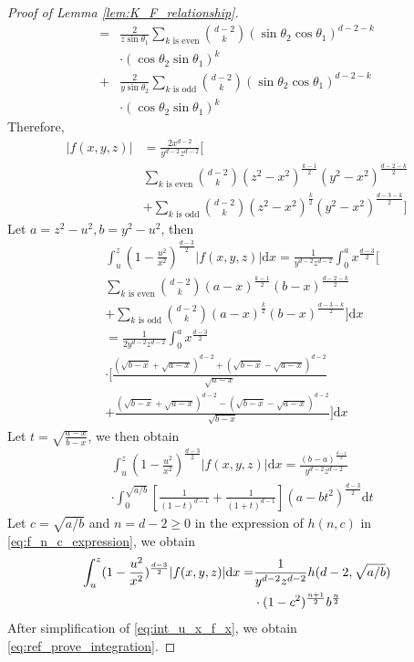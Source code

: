 \documentclass[conference,a4paper]{IEEEtran}
\def\dd{\mathrm{d}}
\begin{document}
\begin{proof}[Proof of Lemma \ref{lem:K_F_relationship}]
\begin{align*}
=&\frac{2}{z\sin\theta_1}\sum_{k \textrm{ is even}}
\binom{d-2}{k} (\sin\theta_2\cos\theta_1)^{d-2-k}\\
&\cdot(\cos\theta_2 \sin\theta_1)^k \\
+&\frac{2}{y\sin\theta_2} \sum_{k \textrm{ is odd}}
\binom{d-2}{k} (\sin\theta_2\cos\theta_1)^{d-2-k}\\
&\cdot(\cos\theta_2 \sin\theta_1)^k
\end{align*}
Therefore,
\begin{align*}
|f(x,y,z)|
&= \frac{2x^{d-2}}{y^{d-2}z^{d-2}}
\Big[
     \\
    &\sum_{k \textrm{ is even}}
    \binom{d-2}{k} (z^2-x^2)^{\frac{k-1}{2}}(y^2-x^2)^{\frac{d-2-k}{2}}\\
    &+ \sum_{k \textrm{ is odd}}
    \binom{d-2}{k}    (z^2-x^2)^{\frac{k}{2}}
    (y^2-x^2)^{\frac{d-3-k}{2}}
\Big]
\end{align*}
Let $a=z^2-u^2, b=y^2-u^2$, then
\begin{align*}
     &\int_u^z (1-\frac{u^2}{x^2})^{\frac{d-3}{2}}
     |f(x,y,z)|\dd x
     =\frac{1}{y^{d-2}z^{d-2}}
     \int_0^a x^{\frac{d-3}{2}}\Big[ \\
     &\sum_{k \textrm{ is even}}
     \binom{d-2}{k} (a-x)^{\frac{k-1}{2}}
     (b-x)^{\frac{d-2-k}{2}}\\
     &+ \sum_{k \textrm{ is odd}}
     \binom{d-2}{k} (a-x)^{\frac{k}{2}}
     (b-x)^{\frac{d-3-k}{2}}
     \Big]\dd x\\
     &=\frac{1}{2y^{d-2}z^{d-2}}
     \int_0^a x^{\frac{d-3}{2}}\\
     &\cdot\Big[\frac{(\sqrt{b-x} + \sqrt{a-x})^{d-2}+(\sqrt{b-x} - \sqrt{a-x})^{d-2}}{\sqrt{a-x}}\\
     &+\frac{(\sqrt{b-x} + \sqrt{a-x})^{d-2}-(\sqrt{b-x} - \sqrt{a-x})^{d-2}}{\sqrt{b-x}}\Big] \dd x
\end{align*}
Let $t=\sqrt{\frac{a-x}{b-x}}$, we then obtain
\begin{align*}
     &\int_u^z (1-\frac{u^2}{x^2})^{\frac{d-3}{2}}
     |f(x,y,z)|\dd x= \frac{(b-a)^{\frac{d-1}{2}}}{y^{d-2}z^{d-2}}\\
     &\cdot\int_0^{\sqrt{a/b}}
     \left[\frac{1}{(1-t)^{d-1}}+\frac{1}{(1+t)^{d-1}}\right](a-bt^2)^{\frac{d-3}{2}}\dd t
\end{align*}
Let $c=\sqrt{a/b}$ and $n=d-2\geq 0$ in the expression of $h(n,c)$ in \eqref{eq:f_n_c_expression},
we obtain
\begin{align}
     \int_u^z (1-\frac{u^2}{x^2})^{\frac{d-3}{2}}
     |f(x,y,z)|\dd x
     =& \frac{1}{y^{d-2}z^{d-2}}h(d-2, \sqrt{a/b}) \notag\\
     &\cdot(1-c^2)^{\frac{n+1}{2}}b^{\frac{n}{2}}\label{eq:int_u_x_f_x}
\end{align}
After simplification of \eqref{eq:int_u_x_f_x}, we obtain \eqref{eq:ref_prove_integration}.
\end{proof}
\end{document}
